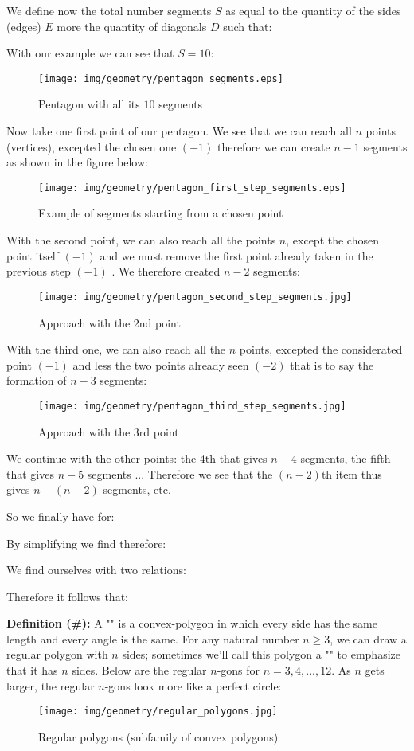 {We define now the total number segments $S$ as equal to the quantity of the sides (edges) $E$ more the quantity of diagonals $D$ such that:
	
With our example we can see that $S=10$:

\begin{figure}[H]
\centering
\texttt{[image: img/geometry/pentagon\_segments.eps]}
\caption{Pentagon with all its $10$ segments}
\end{figure}

	Now take one first point of our pentagon. We see that we can reach all $n$ points (vertices), excepted the chosen one $(-1)$ therefore we can create $n-1$ segments as shown in the figure below:

	\begin{figure}[H]
	\centering
		\texttt{[image: img/geometry/pentagon\_first\_step\_segments.eps]}
	\caption{Example of segments starting from a chosen point}
	\end{figure}

	With the second point, we can also reach all the points $n$, except the chosen point itself $(-1)$ and we must remove the first point already taken in the previous step $(-1)$ . We therefore created $n-2$ segments:

	\begin{figure}[H]
	\centering
		\texttt{[image: img/geometry/pentagon\_second\_step\_segments.jpg]}
	\caption{Approach with the 2nd point}
	\end{figure}
	With the third one, we can also reach all the $n$ points, excepted the considerated point $(-1)$ and less the two points already seen $(-2)$ that is to say the formation of $n-3$ segments:
	\begin{figure}[H]
	\centering
		\texttt{[image: img/geometry/pentagon\_third\_step\_segments.jpg]}
	\caption{Approach with the 3rd point}
	\end{figure}
	We continue with the other points: the 4th that gives $n - 4$ segments, the fifth that gives $n - 5$ segments ... Therefore we see that the $(n - 2)\text{th}$ item thus gives $n - (n - 2 )$ segments, etc.
	
	So we finally have for:
	
	By simplifying we find therefore:
	
	We find ourselves with two relations:
	
	Therefore it follows that:
	
	
	\textbf{Definition (\#\mydef):} A "" is a convex-polygon in which every side has the same length and every angle is the same. For any natural number $n\geq 3$, we can draw a regular polygon with $n$ sides; sometimes we'll call this polygon a "" to emphasize that it has $n$ sides. Below are the regular $n$-gons for $n = 3, 4, ..., 12$. As $n$ gets larger, the regular $n$-gons look more like a perfect circle:
	\begin{figure}[H]
	\centering
		\texttt{[image: img/geometry/regular\_polygons.jpg]}
	\caption{Regular polygons (subfamily of convex polygons)}
	\end{figure}
	
}
